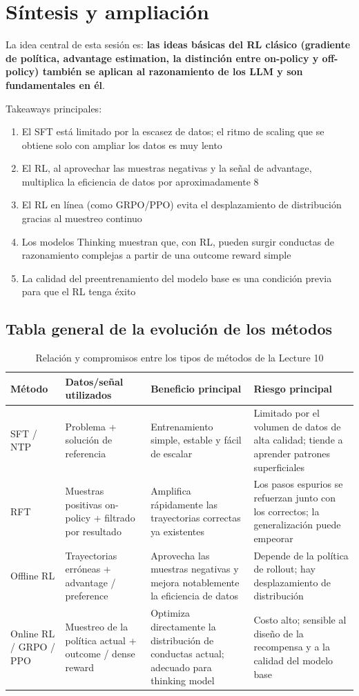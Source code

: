 \section{Síntesis y ampliación}

La idea central de esta sesión es: \textbf{las ideas básicas del RL clásico (gradiente de política, advantage estimation, la distinción entre on-policy y off-policy) también se aplican al razonamiento de los LLM y son fundamentales en él}.

Takeaways principales:
\begin{enumerate}
    \item El SFT está limitado por la escasez de datos; el ritmo de scaling que se obtiene solo con ampliar los datos es muy lento
    \item El RL, al aprovechar las muestras negativas y la señal de advantage, multiplica la eficiencia de datos por aproximadamente 8
    \item El RL en línea (como GRPO/PPO) evita el desplazamiento de distribución gracias al muestreo continuo
    \item Los modelos Thinking muestran que, con RL, pueden surgir conductas de razonamiento complejas a partir de una outcome reward simple
    \item La calidad del preentrenamiento del modelo base es una condición previa para que el RL tenga éxito
\end{enumerate}

\subsection{Tabla general de la evolución de los métodos}

\begin{table}[H]
\centering
\begin{tabular}{p{} p{} p{} p{}}
\toprule
Método & Datos/señal utilizados & Beneficio principal & Riesgo principal \\
\midrule
SFT / NTP & Problema + solución de referencia & Entrenamiento simple, estable y fácil de escalar & Limitado por el volumen de datos de alta calidad; tiende a aprender patrones superficiales \\
RFT & Muestras positivas on-policy + filtrado por resultado & Amplifica rápidamente las trayectorias correctas ya existentes & Los pasos espurios se refuerzan junto con los correctos; la generalización puede empeorar \\
Offline RL & Trayectorias erróneas + advantage / preference & Aprovecha las muestras negativas y mejora notablemente la eficiencia de datos & Depende de la política de rollout; hay desplazamiento de distribución \\
Online RL / GRPO / PPO & Muestreo de la política actual + outcome / dense reward & Optimiza directamente la distribución de conductas actual; adecuado para thinking model & Costo alto; sensible al diseño de la recompensa y a la calidad del modelo base \\
\bottomrule
\end{tabular}
\caption{Relación y compromisos entre los tipos de métodos de la Lecture 10}
\end{table}

